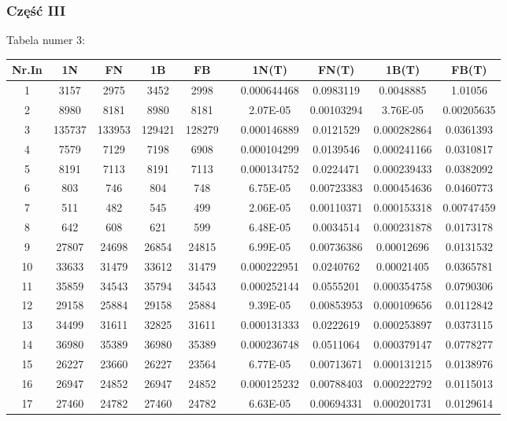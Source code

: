 \documentclass{article}
\begin{document}
\subsubsection{Część III}
Tabela numer 3:
\begin{table}[h!]
\centering
\begin{tabular}{c||c|c|c|c c c|c|c|c}
Nr.In & 1N & FN & 1B & FB &  & 1N(T) & FN(T) & 1B(T) & FB(T) \\
\hline
1 & 3157 & 2975 & 3452 & 2998 &  & 0.000644468 & 0.0983119 & 0.0048885 & 1.01056 \\
2 & 8980 & 8181 & 8980 & 8181 &  & 2.07E-05 & 0.00103294 & 3.76E-05 & 0.00205635 \\
3 & 135737 & 133953 & 129421 & 128279 &  & 0.000146889 & 0.0121529 & 0.000282864 & 0.0361393 \\
4 & 7579 & 7129 & 7198 & 6908 &  & 0.000104299 & 0.0139546 & 0.000241166 & 0.0310817 \\
5 & 8191 & 7113 & 8191 & 7113 &  & 0.000134752 & 0.0224471 & 0.000239433 & 0.0382092 \\
6 & 803 & 746 & 804 & 748 &  & 6.75E-05 & 0.00723383 & 0.000454636 & 0.0460773 \\
7 & 511 & 482 & 545 & 499 &  & 2.06E-05 & 0.00110371 & 0.000153318 & 0.00747459 \\
8 & 642 & 608 & 621 & 599 &  & 6.48E-05 & 0.0034514 & 0.000231878 & 0.0173178 \\
9 & 27807 & 24698 & 26854 & 24815 &  & 6.99E-05 & 0.00736386 & 0.00012696 & 0.0131532 \\
10 & 33633 & 31479 & 33612 & 31479 &  & 0.000222951 & 0.0240762 & 0.00021405 & 0.0365781 \\
11 & 35859 & 34543 & 35794 & 34543 &  & 0.000252144 & 0.0555201 & 0.000354758 & 0.0790306 \\
12 & 29158 & 25884 & 29158 & 25884 &  & 9.39E-05 & 0.00853953 & 0.000109656 & 0.0112842 \\
13 & 34499 & 31611 & 32825 & 31611 &  & 0.000131333 & 0.0222619 & 0.000253897 & 0.0373115 \\
14 & 36980 & 35389 & 36980 & 35389 &  & 0.000236748 & 0.0511064 & 0.000379147 & 0.0778277 \\
15 & 26227 & 23660 & 26227 & 23564 &  & 6.77E-05 & 0.00713671 & 0.000131215 & 0.0138976 \\
16 & 26947 & 24852 & 26947 & 24852 &  & 0.000125232 & 0.00788403 & 0.000222792 & 0.0115013 \\
17 & 27460 & 24782 & 27460 & 24782 &  & 6.63E-05 & 0.00694331 & 0.000201731 & 0.0129614 \\

\end{tabular}
\end{table}
\end{document}
